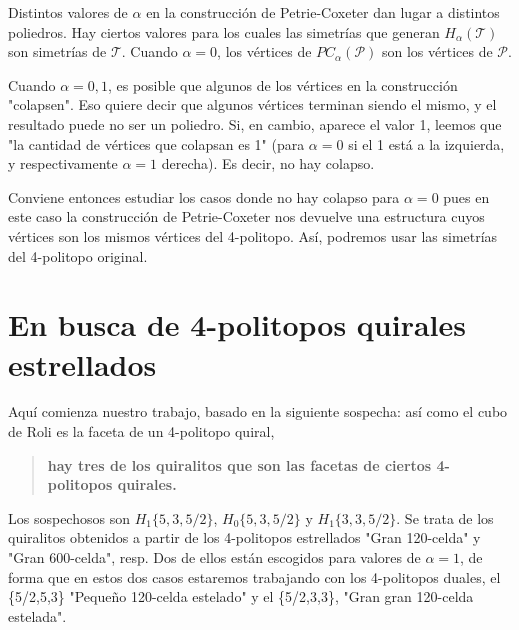 \documentclass[spanish]{article}
\theoremstyle{definition}
\newtheorem*{teo}{Teorema}
\begin{document}
	Distintos valores de $\alpha$ en la construcción de Petrie-Coxeter dan lugar a distintos poliedros. Hay ciertos valores para los cuales las simetrías que generan $H_\alpha(\mathcal{T})$ son simetrías de $\mathcal{T}$. Cuando $\alpha=0$, los vértices de $PC_\alpha(\mathcal{P})$ son los vértices de $\mathcal{P}$.
	
	Cuando $\alpha=0,1$, es posible que algunos de los vértices en la construcción "colapsen". Eso quiere decir que algunos vértices terminan siendo el mismo, y el resultado puede no ser un poliedro. Si, en cambio, aparece el valor 1, leemos que "la cantidad de vértices que colapsan es 1" (para $\alpha=0$ si el 1 está a la izquierda, y respectivamente $\alpha=1$ derecha). Es decir, no hay colapso.
	
	Conviene entonces estudiar los casos donde no hay colapso para $\alpha=0$ pues en este caso la construcción de Petrie-Coxeter nos devuelve una estructura cuyos vértices son los mismos vértices del 4-politopo. Así, podremos usar las simetrías del 4-politopo original.
	
	
	
	
	
\section{En busca de 4-politopos quirales estrellados}
Aquí comienza nuestro trabajo, basado en la siguiente sospecha: así como el cubo de Roli es la faceta de un 4-politopo quiral, 

\begin{quote}\textbf{hay tres de los quiralitos que son las facetas de ciertos 4-politopos quirales.}\end{quote}

Los sospechosos son $H_1\{5,3,5/2\}$, $H_0\{5,3,5/2\}$ y $H_1\{3,3,5/2\}$. Se trata de los quiralitos obtenidos a partir de los 4-politopos estrellados "Gran 120-celda" y "Gran 600-celda", resp. Dos de ellos están escogidos para valores de $\alpha=1$, de forma que en estos dos casos estaremos trabajando con los 4-politopos duales, el \{5/2,5,3\} "Pequeño 120-celda estelado" y el \{5/2,3,3\}, "Gran gran 120-celda estelada".
\end{document}
